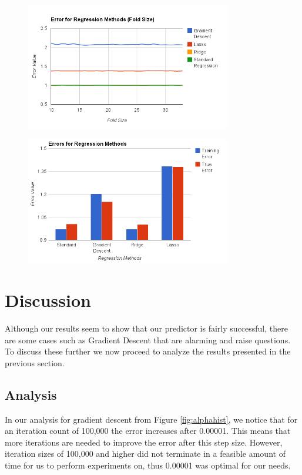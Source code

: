 \documentclass[conference]{IEEEtran}
\begin{document}
\begin{center}

\begin{figure}[ht!]
\includegraphics[width=90mm]{errFoldSize.png}
\caption{}\label{fig:foldgraph}
\end{figure}

\begin{figure}[ht!]
\includegraphics[width=90mm]{errorHistogramWith10fold.png}
\caption{}\label{fig:errorhist}
\end{figure}
\section{Discussion}
\end{center}
Although our results seem to show that our predictor is fairly 
successful, there are some cases such as Gradient Descent that 
are alarming and raise questions. To discuss these further we now 
proceed to analyze the results presented in the previous section. 

\subsection{Analysis}
In our analysis for gradient descent from Figure \ref{fig:alphahist}, we notice that for an iteration
count of 100,000 the error increases after 0.00001. This means 
that more iterations are needed to improve the error after this step size. 
However, iteration sizes of 100,000 and higher did not terminate in a feasible 
amount of time for us to perform experiments on, thus 0.00001 was optimal for
our needs.
\end{document}
